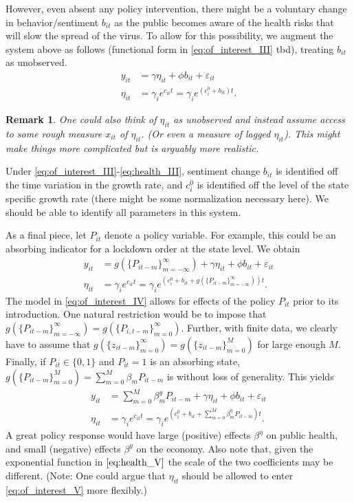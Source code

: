 \documentclass{article}[12pt]
\newtheorem{remark}{Remark}
\begin{document}
However, even absent any policy intervention, there might be a voluntary change in behavior/sentiment $b_{it}$ as the public becomes aware of the health risks that will slow the spread of the virus. To allow for this possibility, we augment the system above as follows (functional form in \eqref{eq:of_interest_III} tbd), treating $b_{it}$ as unobserved.
\begin{align}
y_{it} &=  \gamma \eta_{it} + \phi b_{it} + \varepsilon_{it} \label{eq:of_interest_III}\\
\eta_{it}&=\gamma_{i} e^{c_{it} t}= \gamma_{i} e^{(c^0_i + b_{it}) t}.  \label{eq:health_III}
\end{align}
\begin{remark}
One could also think of $\eta_{it}$ as unobserved and instead assume access to some rough measure $x_{it}$ of $\eta_{it}$. (Or even a measure of lagged $\eta_{it}$). This might make things more complicated but is arguably more realistic.
\end{remark}

Under \eqref{eq:of_interest_III}-\eqref{eq:health_III}, sentiment change $b_{it}$ is identified off the time variation in the growth rate, and $c_i^0$ is identified  off the level of the state specific growth rate (there might be some normalization necessary here). We should be able to identify all parameters in this system.


As a final piece, let $P_{it}$ denote a policy variable. For example, this could be an absorbing indicator for a lockdown order at the state level.  We obtain
\begin{align}
y_{it} &=  g(\{P_{it-m}\}_{m=-\infty}^{\infty}) + \gamma \eta_{it} + \phi b_{it} + \varepsilon_{it} \label{eq:of_interest_IV}\\
\eta_{it}&=\gamma_{i} e^{c_{it} t}=\gamma_{i} e^{(c^0_i + b_{it} + g(\{P_{it-m}\}_{m=-\infty}^{\infty})) t}. \label{eq:health_IV}
\end{align}
The model in \eqref{eq:of_interest_IV} allows for effects of the policy $P_{it}$ prior to its introduction. One natural restriction would be to impose that $g(\{P_{it-m}\}_{m=-\infty}^{\infty}) =g(\{P_{i,t-m}\}_{m=0}^{\infty})$. Further, with finite data, we clearly have to assume that $g(\{z_{it-m}\}_{m=0}^{\infty}) = g(\{z_{it-m}\}_{m=0}^{M})$ for large enough $M$. Finally, if $P_{it} \in \{0,1\}$ and $P_{it} = 1$ is an absorbing state, $g(\{P_{it-m}\}_{m=0}^{M}) = \sum_{m=0}^M \beta_m P_{it-m}$ is without loss of generality. %
This yields
\begin{align}
y_{it} &=  \sum_{m=0}^M \beta^y_m P_{it-m} + \gamma \eta_{it} + \phi b_{it} + \varepsilon_{it} \label{eq:of_interest_V}\\
\eta_{it}&=\gamma_{i} e^{c_{it} t}=\gamma_{i} e^{(c^0_i + b_{it} + \sum_{m=0}^M \beta^\eta_m P_{it-m} ) t}. \label{eq:health_V}
\end{align}
A great policy response would have large (positive) effects $\beta^\eta$ on public health, and small (negative) effects $\beta^y$ on the economy. Also note that, given the exponential function in $\eqref{eq:health_V}$ the scale of the two coefficients may be different. (Note: One could argue that $\eta_{it}$ should be allowed to enter \ref{eq:of_interest_V} more flexibly.)
\end{document}

